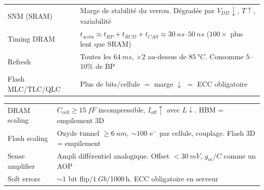 \documentclass[12pt,a4paper,twoside]{book}
\begin{document}
\begin{approfondissement}[title={\color{white} Résumé --- Approfondissement}]
\begin{center}
\renewcommand{\arraystretch}{1.3}
\begin{tabular}{p{3.5cm}p{9.5cm}}
\toprule
SNM (SRAM) & Marge de stabilité du verrou. Dégradée par $V_{DD}\downarrow$, $T\uparrow$, variabilité \\
Timing DRAM & $t_{\text{accès}} \approx t_{RP}+t_{RCD}+t_{CAS} \approx \SI{30}{ns}$--$\SI{50}{ns}$ ($100\times$ plus lent que SRAM) \\
Refresh & Toutes les $\SI{64}{ms}$, $\times 2$ au-dessus de $\SI{85}{°C}$. Consomme $5$--$10\%$ de BP \\
Flash MLC/TLC/QLC & Plus de bits/cellule $=$ marge $\downarrow$ $=$ ECC obligatoire \\
\bottomrule
\end{tabular}
\end{center}
\end{approfondissement}

\begin{ingenieur}[title={\color{white} Résumé --- Niveau Ingénieur}]
\begin{center}
\renewcommand{\arraystretch}{1.3}
\begin{tabular}{p{3.5cm}p{9.5cm}}
\toprule
DRAM scaling & $C_{\text{cell}} \geq \SI{15}{fF}$ incompressible, $I_{\text{off}} \uparrow$ avec $L\downarrow$. HBM = empilement 3D \\
Flash scaling & Oxyde tunnel $\geq \SI{6}{nm}$, $\sim 100$ e$^-$ par cellule, couplage. Flash 3D = empilement \\
Sense amplifier & Ampli différentiel analogique. Offset $< \SI{30}{mV}$, $g_m/C$ comme un AOP \\
Soft errors & $\sim 1$ bit flip/$\SI{1}{Gb}$/1000\,h. ECC obligatoire en serveur \\
\bottomrule
\end{tabular}
\end{center}
\end{ingenieur}



\end{document}
